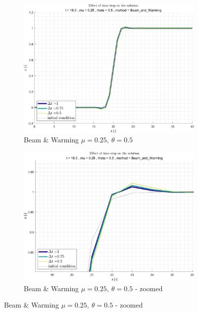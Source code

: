 \documentclass[11pt, a4paper]{article}
\begin{document}
\begin{figure}[H]
\begin{subfigure}[c]{.38\textwidth}
        \label{fig:Beam_&_Warming_general_mu0.001_theta1_B_diff_time}
    \end{subfigure}
    \begin{subfigure}[c]{.38\textwidth}
        \centering
        \includegraphics[width=\textwidth]{images/grap14.png}
        \caption{Beam $\&$ Warming $\mu=0.25,\ \theta=0.5$}
        \label{fig:Beam & Warming_general_mu0.25_theta0.5_A_diff_time}
    \end{subfigure}
    \begin{subfigure}[c]{.38\textwidth}
        \centering
        \includegraphics[width=\textwidth]{images/grap14.1.png}
        \caption{Beam $\&$ Warming $\mu=0.25,\ \theta=0.5$ - zoomed}

\end{subfigure}
\end{figure}
\end{document}
